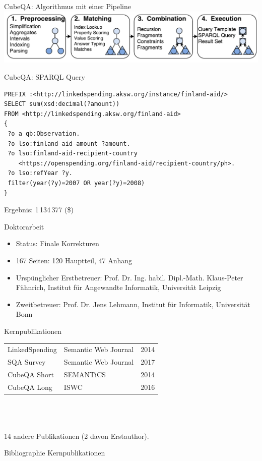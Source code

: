 \documentclass[14pt,aspectratio=1610]{beamer}
\begin{document}
\begin{frame}{CubeQA: Algorithmus mit einer Pipeline}
\centering
\includegraphics[width=\columnwidth]{img/cubeqapipeline-numbered.pdf}
\end{frame}

\begin{frame}[fragile]{CubeQA: SPARQL Query}
\small
\begin{lstlisting}[language=sparql]
PREFIX :<http://linkedspending.aksw.org/instance/finland-aid/>
SELECT sum(xsd:decimal(?amount))
FROM <http://linkedspending.aksw.org/finland-aid>                                                                                                                                                                  
{
 ?o a qb:Observation.
 ?o lso:finland-aid-amount ?amount.
 ?o lso:finland-aid-recipient-country
    <https://openspending.org/finland-aid/recipient-country/ph>.
 ?o lso:refYear ?y.
 filter(year(?y)=2007 OR year(?y)=2008)
}
\end{lstlisting}
Ergebnis: 1\,134\,377 (\$)
\end{frame}

\begin{frame}{Doktorarbeit}
\begin{itemize}
\item Status: Finale Korrekturen
\item 167 Seiten: 120 Hauptteil, 47 Anhang
\item Urspünglicher Erstbetreuer: Prof. Dr. Ing. habil. Dipl.-Math. Klaus-Peter Fähnrich, Institut für Angewandte Informatik, Universität Leipzig
\item Zweitbetreuer: Prof. Dr. Jens Lehmann, Institut für Informatik, Universität Bonn
\end{itemize}
\end{frame}


\begin{frame}{Kernpublikationen}
\begin{tabular}{lll}
LinkedSpending \cite{linkedspending}	&Semantic Web Journal	&2014\\
SQA Survey \cite{qasurvey}		&Semantic Web Journal	&2017\\
CubeQA Short \cite{cubeqashort}		&SEMANTiCS		&2014\\
CubeQA Long \cite{cubeqa}		&ISWC			&2016\\
\end{tabular}
\\~\\~\\14 andere Publikationen (2 davon Erstauthor).
\end{frame}

\begin{frame}[allowframebreaks]{Bibliographie Kernpublikationen}


\end{frame}
\end{document}
